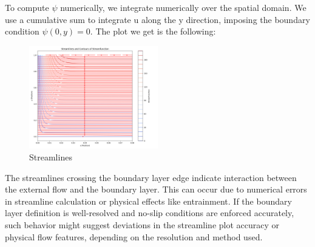 To compute $\psi$ numerically, we integrate numerically over the spatial domain. We use a cumulative sum to integrate u along the y direction, imposing the boundary condition $\psi(0, y) = 0$.
The plot we get is the following:
\begin{figure}[h]
  \centering
  \includegraphics[width=0.5\textwidth]{task_2_6_fixed.png}
  \caption{Streamlines}
\end{figure}
The streamlines crossing the boundary layer edge indicate interaction between the external flow and the boundary layer. This can occur due to numerical errors in streamline calculation or physical effects like entrainment. If the boundary layer definition is well-resolved and no-slip conditions are enforced accurately, such behavior might suggest deviations in the streamline plot accuracy or physical flow features, depending on the resolution and method used.

